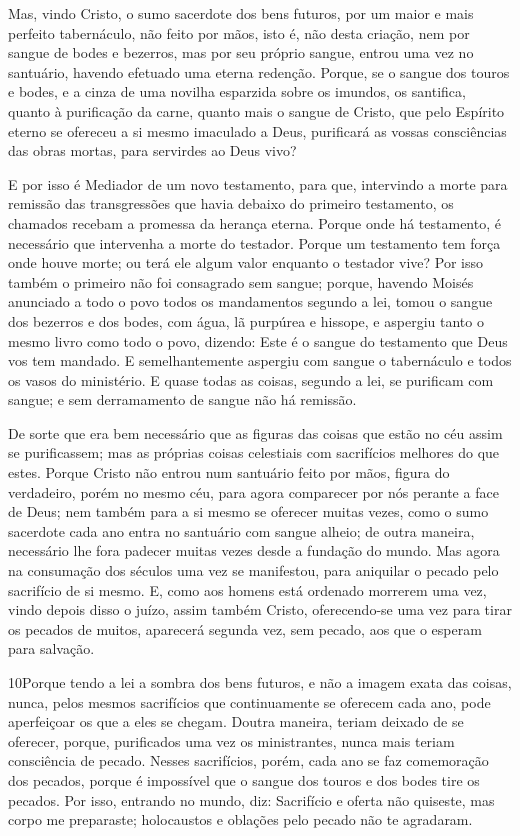 Mas, vindo Cristo, o sumo sacerdote dos bens futuros, por um
maior e mais perfeito tabernáculo, não feito por mãos, isto é, não
desta criação, nem por sangue de bodes e bezerros, mas por
seu próprio sangue, entrou uma vez no santuário, havendo efetuado
uma eterna redenção. Porque, se o sangue dos touros e bodes,
e a cinza de uma novilha esparzida sobre os imundos, os santifica,
quanto à purificação da carne, quanto mais o sangue de
Cristo, que pelo Espírito eterno se ofereceu a si mesmo imaculado a
Deus, purificará as vossas consciências das obras mortas, para
servirdes ao Deus vivo?

E por isso é Mediador de um novo testamento, para que, intervindo
a morte para remissão das transgressões que havia debaixo do
primeiro testamento, os chamados recebam a promessa da herança
eterna. Porque onde há testamento, é necessário que
intervenha a morte do testador. Porque um testamento tem
força onde houve morte; ou terá ele algum valor enquanto o testador
vive? Por isso também o primeiro não foi consagrado sem
sangue; porque, havendo Moisés anunciado a todo o povo todos
os mandamentos segundo a lei, tomou o sangue dos bezerros e dos
bodes, com água, lã purpúrea e hissope, e aspergiu tanto o mesmo
livro como todo o povo, dizendo: Este é o sangue do
testamento que Deus vos tem mandado. E semelhantemente
aspergiu com sangue o tabernáculo e todos os vasos do ministério.
E quase todas as coisas, segundo a lei, se purificam com
sangue; e sem derramamento de sangue não há remissão.

De sorte que era bem necessário que as figuras das coisas que
estão no céu assim se purificassem; mas as próprias coisas
celestiais com sacrifícios melhores do que estes. Porque
Cristo não entrou num santuário feito por mãos, figura do
verdadeiro, porém no mesmo céu, para agora comparecer por nós
perante a face de Deus; nem também para a si mesmo se
oferecer muitas vezes, como o sumo sacerdote cada ano entra no
santuário com sangue alheio; de outra maneira, necessário lhe
fora padecer muitas vezes desde a fundação do mundo. Mas agora na
consumação dos séculos uma vez se manifestou, para aniquilar o
pecado pelo sacrifício de si mesmo. E, como aos homens está
ordenado morrerem uma vez, vindo depois disso o juízo, assim
também Cristo, oferecendo-se uma vez para tirar os pecados de
muitos, aparecerá segunda vez, sem pecado, aos que o esperam para
salvação.

\medskip

\lettrine{10} Porque tendo a lei a sombra dos bens futuros, e
não a imagem exata das coisas, nunca, pelos mesmos sacrifícios que
continuamente se oferecem cada ano, pode aperfeiçoar os que a eles
se chegam. Doutra maneira, teriam deixado de se oferecer,
porque, purificados uma vez os ministrantes, nunca mais teriam
consciência de pecado. Nesses sacrifícios, porém, cada ano se
faz comemoração dos pecados, porque é impossível que o sangue
dos touros e dos bodes tire os pecados. Por isso, entrando no
mundo, diz: Sacrifício e oferta não quiseste, mas corpo me
preparaste; holocaustos e oblações pelo pecado não te agradaram.

